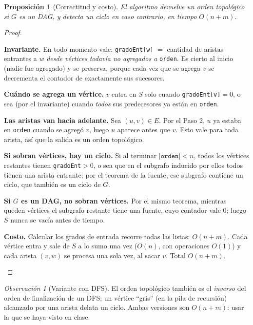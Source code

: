 \documentclass[11pt,a4paper]{article}
\theoremstyle{plain}
\newtheorem{proposicion}[teorema]{Proposición}
\theoremstyle{definition}
\theoremstyle{remark}
\newtheorem*{observacion}{Observación}
\begin{document}
\begin{proposicion}[Correctitud y costo]
El algoritmo devuelve un orden topológico si $G$ es un DAG, y detecta un ciclo en caso
contrario, en tiempo $O(n+m)$.
\end{proposicion}
\begin{proof}
\begin{pasos}
\item \textbf{Invariante.} En todo momento vale: \texttt{gradoEnt[w]} $=$ cantidad de
aristas entrantes a $w$ \emph{desde vértices todavía no agregados a} \texttt{orden}.
Es cierto al inicio (nadie fue agregado) y se preserva, porque cada vez que se agrega
$v$ se decrementa el contador de exactamente sus sucesores.
\item \textbf{Cuándo se agrega un vértice.} $v$ entra en $S$ solo cuando
\texttt{gradoEnt[v]}$=0$, o sea (por el invariante) cuando \emph{todos} sus
predecesores ya están en \texttt{orden}.
\item \textbf{Las aristas van hacia adelante.} Sea $(u,v)\in E$. Por el Paso 2, $u$ ya
estaba en \texttt{orden} cuando se agregó $v$, luego $u$ aparece antes que $v$. Esto
vale para toda arista, así que la salida es un orden topológico.
\item \textbf{Si sobran vértices, hay un ciclo.} Si al terminar $|\texttt{orden}|<n$,
todos los vértices restantes tienen \texttt{gradoEnt}$>0$, o sea que en el subgrafo
inducido por ellos todos tienen una arista entrante; por el teorema de la fuente, ese
subgrafo contiene un ciclo, que también es un ciclo de $G$.
\item \textbf{Si $G$ es un DAG, no sobran vértices.} Por el mismo teorema, mientras
queden vértices el subgrafo restante tiene una fuente, cuyo contador vale $0$; luego
$S$ nunca se vacía antes de tiempo.
\item \textbf{Costo.} Calcular los grados de entrada recorre todas las listas: $O(n+m)$.
Cada vértice entra y sale de $S$ a lo sumo una vez ($O(n)$, con operaciones $O(1)$) y
cada arista $(v,w)$ se procesa una sola vez, al sacar $v$. Total $O(n+m)$. \qedhere
\end{pasos}
\end{proof}

\begin{observacion}[Variante con DFS]
El orden topológico también es el \emph{inverso} del orden de finalización de un DFS;
un vértice ``gris'' (en la pila de recursión) alcanzado por una arista delata un ciclo.
Ambas versiones son $O(n+m)$: usar la que se haya visto en clase.
\end{observacion}
\end{document}

